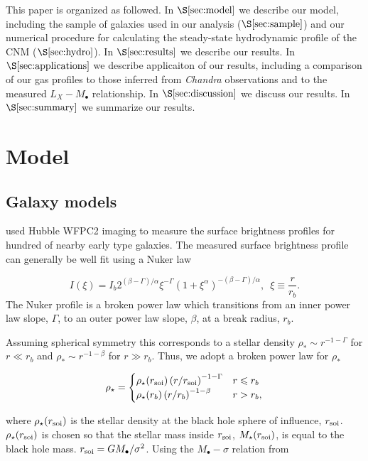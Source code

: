 \documentclass[usenatbib,fleqn]{mn2e}
\newcommand{\rb}{r_b}
\newcommand{\rhostar}{\rho_*}
\newcommand{\Mstar}{M_{\star}}
\newcommand{\Mbh}[1][]{M_{\bullet#1}}
\newcommand{\soi}{\rm soi}
\newcommand{\rsoi}{r_{\soi}}
\begin{document}
This paper is organized as followed.  In $\S\ref{sec:model}$ we
describe our model, including the sample of galaxies used in our
analysis ($\S\ref{sec:sample}$) and our numerical procedure for
calculating the steady-state hydrodynamic profile of the CNM
($\S\ref{sec:hydro}$).  In $\S\ref{sec:results}$ we describe our
results.  In $\S\ref{sec:applications}$ we describe applicaiton of our
results, including a comparison of our gas profiles to those inferred
from {\it Chandra} observations and to the measured $L_X-\Mbh$
relationship.  In $\S\ref{sec:discussion}$ we discuss our results.  In
$\S\ref{sec:summary}$ we summarize our results.
\section{Model}
\label{sec:model}
\subsection{Galaxy models}
\citealt{LauerFaber+:2007a} used Hubble WFPC2 imaging to measure the
surface brightness profiles for hundred of nearby early type
galaxies. The measured surface brightness profile can generally be
well fit using a Nuker law

\begin{equation}
  I(\xi)=I_b 2^{(\beta-\Gamma)/\alpha} \xi^{-\Gamma} (1+\xi^\alpha)^{-(\beta-\Gamma)/\alpha}, \,\,\,\xi\equiv\frac{r}{r_b}.
\end{equation}
The Nuker profile is a broken power law which transitions from an
inner power law slope, $\Gamma$, to an outer power law slope, $\beta$,
at a break radius, $\rb$.

Assuming spherical symmetry this corresponds to a stellar density
$\rhostar \sim r^{-1-\Gamma}$ for $r \ll \rb$ and $\rhostar\sim
r^{-1-\beta}$ for $r \gg \rb$. Thus, we adopt a broken power law for 
$\rhostar$ 

\begin{align}
\rho_\star = 
\begin{cases}
\rho_\star(\rsoi) \left(r/\rsoi\right)^{-1-\Gamma} & r \leq r_b\\
\rho_\star(r_b) \left(r/r_b\right)^{-1-\beta} & r > r_b,
\end{cases}
\end{align}

where $\rho_\star(\rsoi)$ is the stellar density at the black hole
sphere of influence, $\rsoi$. $\rho_\star(\rsoi)$ is chosen so that
the stellar mass inside $\rsoi$, $\Mstar(\rsoi)$, is equal to the
black hole mass.  $\rsoi=G \Mbh/\sigma^2$. Using the $\Mbh-\sigma$ relation
from \citealt{Gultekin+09}
\end{document}
